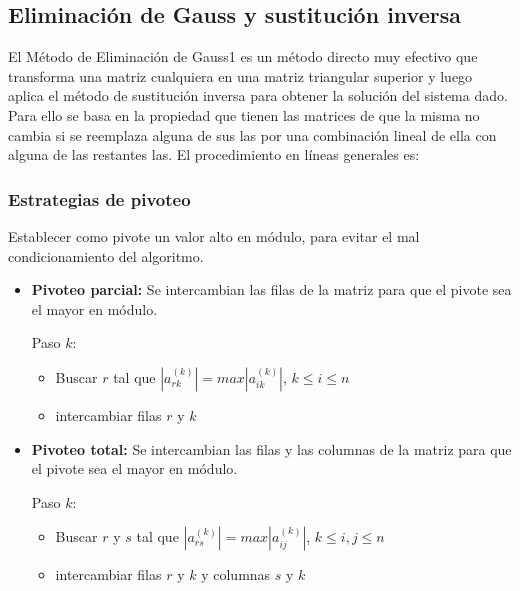\documentclass[../main.tex]{subfiles}
\begin{document}
    \subsection{Eliminación de Gauss y sustitución inversa}
        El Método de Eliminación de Gauss1 es un método directo muy efectivo que transforma una matriz cualquiera en una matriz triangular superior y luego aplica el método de sustitución inversa para obtener la solución del sistema dado. Para ello se basa en la propiedad que tienen las matrices de que la misma no cambia si se reemplaza alguna de sus las por una combinación lineal de ella con alguna de las restantes las. El procedimiento en líneas generales es:\\


        \subsubsection{Estrategias de pivoteo}
            Establecer como pivote un valor alto en módulo, para evitar el mal condicionamiento del algoritmo.
            \begin{itemize}
                \item \textbf{Pivoteo parcial:} 
                    Se intercambian las filas de la matriz para que el pivote sea el mayor en módulo.
                    
                    Paso $k$:
                    \begin{itemize}
                        \item Buscar $r$ tal que $|a_{rk}^{(k)}| = max|a_{ik}^{(k)}|$, $k \leq  i \leq n $
                        \item intercambiar filas $r$ y $k$
                    \end{itemize}

                    
                \item \textbf{Pivoteo total:} 
                    Se intercambian las filas y las columnas de la matriz para que el pivote sea el mayor en módulo.

                    Paso $k$:
                    \begin{itemize}
                        \item Buscar $r$ y $s$ tal que $|a_{rs}^{(k)}| = max|a_{ij}^{(k)}|$, $k \leq  i,j \leq n $
                        \item intercambiar filas $r$ y $k$ y columnas $s$ y $k$
                    \end{itemize}

            \end{itemize}
\end{document}

